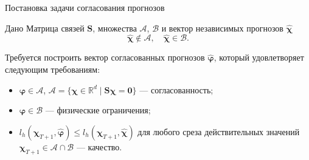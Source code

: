 \documentclass{beamer}
\newcommand{\A}{\mathcal{A}}
\newcommand{\hchi}{\hat{\boldsymbol{\chi}}}
\newcommand{\hphi}{\hat{\boldsymbol{\varphi}}}
\newcommand{\B}{\mathcal{B}}
\newcommand{\SM}{\mathbf{S}}
\begin{document}
\begin{frame}{Постановка задачи согласования прогнозов}

    \begin{block}{Дано}
        Матрица связей $\SM$, множества $\A$, $\B$ и вектор
        независимых прогнозов $\hchi$
        $$
            \hchi \not \in \A, \quad \hchi \in \B.
        $$
    \end{block}
    \vfill

    \begin{block}{Требуется построить}
        вектор согласованных прогнозов $\hphi$, который
        удовлетворяет следующим требованиям:
        \begin{itemize}
            \item $\hphi \in \A$, $\A = \{ \boldsymbol{\chi} \in \mathbb{R}^d \mid \SM \boldsymbol{\chi} = \boldsymbol{0} \}$ ---
            \textcolor[rgb]{1.00,0.00,0.00}{согласованность};
            \item $\hphi \in \B$ --- \textcolor[rgb]{1.00,0.00,0.00}{физические
            ограничения};
            \item $l_h(\boldsymbol{\chi}_{T+1}, \hphi) \leq l_h(
            \boldsymbol{\chi}_{T+1}, \hchi)$ для любого среза действительных значений
            $\boldsymbol{\chi}_{T+1} \in \A \cap \B$ --- \textcolor[rgb]{1.00,0.00,0.00}{качество}.
        \end{itemize}
    \end{block}

\end{frame}
\end{document}
